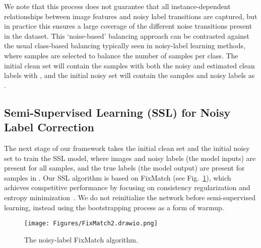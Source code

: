 \documentclass[10pt,twocolumn,letterpaper]{article}
\begin{document}
We note that this process does not guarantee that all instance-dependent relationships between image features and noisy label transitions are captured, but in practice this ensures a large coverage of the different noise transitions present in the dataset. This `noise-based' balancing approach can be contrasted against the usual class-based balancing typically seen in noisy-label learning methods, where samples are selected to balance the number of samples per class.
The initial clean set will contain the samples with both the noisy and estimated clean labels with , and the initial noisy set will contain the samples and noisy labels as . 


\subsection{Semi-Supervised Learning (SSL) for Noisy Label Correction}

The next stage of our framework takes the initial clean set  and the initial noisy set  
to train the SSL model, where images and noisy labels (the model inputs) are present for all samples, and the true labels (the model output) are present for samples in . 
Our SSL algorithm is based on FixMatch (see Fig.~\ref{fig:fixmatch}), which achieves competitive performance by focusing on consistency regularization and entropy minimization~\cite{sohn2020fixmatch}. We do not reinitialize the network before semi-supervised learning, instead using the bootstrapping process as a form of warmup.

\begin{figure}[ht!]
    \begin{center}
    \texttt{[image: Figures/FixMatch2.drawio.png]}
    \end{center}
    \caption{\small The noisy-label  FixMatch algorithm.}
    \label{fig:fixmatch}
\end{figure}
\end{document}
